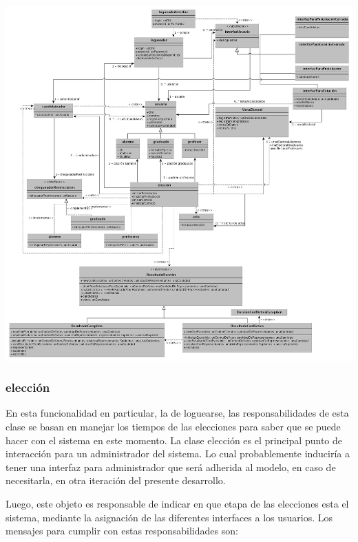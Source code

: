 \begin{center}
\includegraphics[scale=0.35]{diagramas/modeloClases.png} 
\end{center}

\subsubsection{elecci\'on}

En esta funcionalidad en particular, la de loguearse, las responsabilidades de esta clase se basan en manejar los tiempos de las elecciones para saber que se puede hacer con el sistema en este momento. La clase elecci\'on es el principal punto de interacci\'on para un administrador del sistema. Lo cual probablemente inducir\'ia a tener una interfaz para administrador que ser\'a adherida al modelo, en caso de necesitarla, en otra iteraci\'on del presente desarrollo.

Luego, este objeto es responsable de indicar en que etapa de las elecciones esta el sistema, mediante la asignaci\'on de las diferentes interfaces a los usuarios. Los mensajes para cumplir con estas responsabilidades son:

